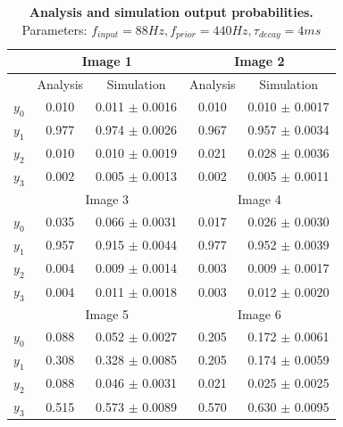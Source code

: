 \begin{table}[]
\label{tab:1D_88_440_4}
\small
\tabcolsep=0.11cm
\begin{tabular}{|c|cc|cc|}
\hline
                       & \multicolumn{2}{c|}{Image 1}                       & \multicolumn{2}{c|}{Image 2}                       \\ \hline
                       & \multicolumn{1}{c|}{Analysis} & Simulation         & \multicolumn{1}{c|}{Analysis} & Simulation         \\ \hline
$y_0$                  & \multicolumn{1}{c|}{0.010}    & 0.011 $\pm$ 0.0016 & \multicolumn{1}{c|}{0.010}    & 0.010 $\pm$ 0.0017 \\ \hline
$y_1$                  & \multicolumn{1}{c|}{0.977}    & 0.974 $\pm$ 0.0026 & \multicolumn{1}{c|}{0.967}    & 0.957 $\pm$ 0.0034 \\ \hline
$y_2$                  & \multicolumn{1}{c|}{0.010}    & 0.010 $\pm$ 0.0019 & \multicolumn{1}{c|}{0.021}    & 0.028 $\pm$ 0.0036 \\ \hline
$y_3$                  & \multicolumn{1}{c|}{0.002}    & 0.005 $\pm$ 0.0013 & \multicolumn{1}{c|}{0.002}    & 0.005 $\pm$ 0.0011 \\ \hline
                       & \multicolumn{2}{c|}{Image 3}                       & \multicolumn{2}{c|}{Image 4}                       \\ \hline
$y_0$                  & \multicolumn{1}{c|}{0.035}    & 0.066 $\pm$ 0.0031 & \multicolumn{1}{c|}{0.017}    & 0.026 $\pm$ 0.0030 \\ \hline
$y_1$                  & \multicolumn{1}{c|}{0.957}    & 0.915 $\pm$ 0.0044 & \multicolumn{1}{c|}{0.977}    & 0.952 $\pm$ 0.0039 \\ \hline
$y_2$                  & \multicolumn{1}{c|}{0.004}    & 0.009 $\pm$ 0.0014 & \multicolumn{1}{c|}{0.003}    & 0.009 $\pm$ 0.0017 \\ \hline
$y_3$                  & \multicolumn{1}{c|}{0.004}    & 0.011 $\pm$ 0.0018 & \multicolumn{1}{c|}{0.003}    & 0.012 $\pm$ 0.0020 \\ \hline
						& \multicolumn{2}{c|}{Image 5}                       & \multicolumn{2}{c|}{Image 6}                       \\ \hline
$y_0$                  & \multicolumn{1}{c|}{0.088}    & 0.052 $\pm$ 0.0027 & \multicolumn{1}{c|}{0.205}    & 0.172 $\pm$ 0.0061 \\ \hline
$y_1$                  & \multicolumn{1}{c|}{0.308}    & 0.328 $\pm$ 0.0085 & \multicolumn{1}{c|}{0.205}    & 0.174 $\pm$ 0.0059 \\ \hline
$y_2$                  & \multicolumn{1}{c|}{0.088}    & 0.046 $\pm$ 0.0031 & \multicolumn{1}{c|}{0.021}    & 0.025 $\pm$ 0.0025 \\ \hline
$y_3$                  & \multicolumn{1}{c|}{0.515}    & 0.573 $\pm$ 0.0089 & \multicolumn{1}{c|}{0.570}    & 0.630 $\pm$ 0.0095 \\ \hline
\end{tabular}
\caption{\textbf{Analysis and simulation output probabilities. } Parameters: $f_{input} = 88 Hz, f_{prior} = 440 Hz, \tau_{decay} = 4 ms$}
\end{table}


